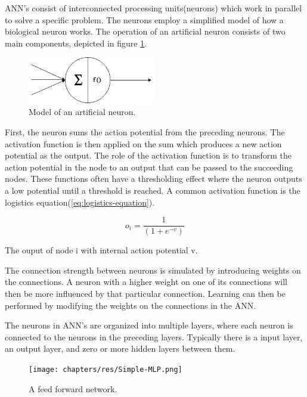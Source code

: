 ANN's consist of interconnected processing units(neurons) which work in parallel to solve a specific problem.
The neurons employ a simplified model of how a biological neuron works.
The operation of an artificial neuron consists of two main components, depicted in figure \ref{fig:artificial-neuron}.

\begin{figure}[H]
	
	\centering
	\includegraphics[width=0.5\textwidth]{chapters/res/Neuron.png}
	\caption{Model of an artificial neuron.}
	\label{fig:artificial-neuron}
\end{figure}
First, the neuron sums the action potential from the preceding neurons.
The activation function is then applied on the sum which produces a new action potential as the output.
The role of the activation function is to transform the action potential in the node to an output that can be passed to the succeeding nodes.
These functions often have a thresholding effect where the neuron outputs a low potential until a threshold is reached.
A common activation function is the logistics equation(\ref{eq:logistics-equation}).

\begin{captioneq}[H]
	\begin{equation}
	o_i= \frac{1}{(1+e^{-v})}
	\label{eq:logistics-equation}
	\end{equation}
	
	\caption{The ouput of node i with internal action potential v.}
\end{captioneq}

The connection strength between neurons is simulated by introducing weights on the connections.
A neuron with a higher weight on one of its connections will then be more influenced by that particular connection.
Learning can then be performed by modifying the weights on the connections in the ANN.


The neurons in ANN's are organized into multiple layers, where each neuron is connected to the neurons in the preceding layers.
Typically there is a input layer, an output layer, and zero or more hidden layers between them.

\begin{figure}[H]
	\centering
	\texttt{[image: chapters/res/Simple-MLP.png]}
	\caption{A feed forward network.}
	\label{fig:mlp-simple}
\end{figure}

